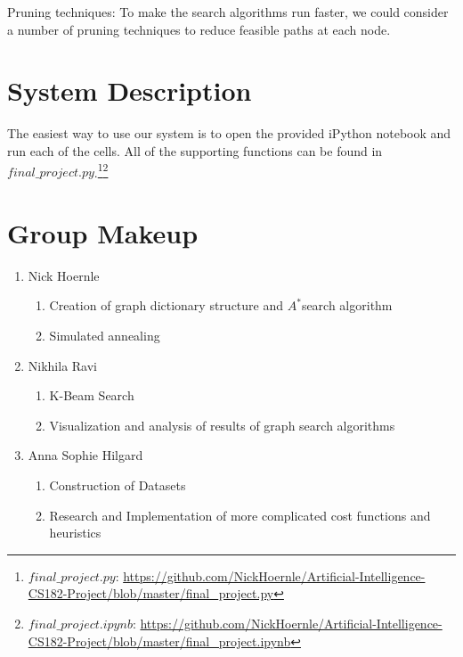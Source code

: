 \documentclass[11pt]{article}
\begin{document}
Pruning techniques:
To make the search algorithms run faster, we could consider a number of pruning
techniques to reduce feasible paths at each node.

\appendix
\section{System Description}

The easiest way to use our system is to open the provided iPython notebook and run each of the cells. All of the supporting functions can be found in $final\_project.py$.\footnote{$final\_project.py$: \url{https://github.com/NickHoernle/Artificial-Intelligence-CS182-Project/blob/master/final_project.py}}\footnote{$final\_project.ipynb$: \url{https://github.com/NickHoernle/Artificial-Intelligence-CS182-Project/blob/master/final_project.ipynb}}

\section{Group Makeup}

\begin{enumerate}
\item Nick Hoernle
\begin{enumerate}
\item Creation of graph dictionary structure and $A^{*}$search algorithm
\item Simulated annealing
\end{enumerate}
\item Nikhila Ravi
\begin{enumerate}
\item K-Beam Search
\item Visualization and analysis of results of graph search algorithms
\end{enumerate}
\item Anna Sophie Hilgard
\begin{enumerate}
\item Construction of Datasets
\item Research and Implementation of more complicated cost functions and heuristics
\end{enumerate}
\end{enumerate}
\end{document}
